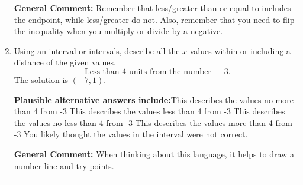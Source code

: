 \documentclass{extbook}[14pt]
\newcommand{\litem}[1]{\item #1

\rule{\textwidth}{0.4pt}}
\begin{document}
\begin{enumerate}
{\textbf{General Comment:} Remember that less/greater than or equal to includes the endpoint, while less/greater do not. Also, remember that you need to flip the inequality when you multiply or divide by a negative.
}
\litem{
Using an interval or intervals, describe all the $x$-values within or including a distance of the given values.
\[ \text{ Less than } 4 \text{ units from the number } -3. \]The solution is \( (-7, 1) \).\begin{enumerate}[label=\Alph*.]
\textbf{Plausible alternative answers include:}This describes the values no more than 4 from -3
This describes the values less than 4 from -3
This describes the values no less than 4 from -3
This describes the values more than 4 from -3
You likely thought the values in the interval were not correct.
\end{enumerate}

\textbf{General Comment:} When thinking about this language, it helps to draw a number line and try points.
}
\end{enumerate}
\end{document}

